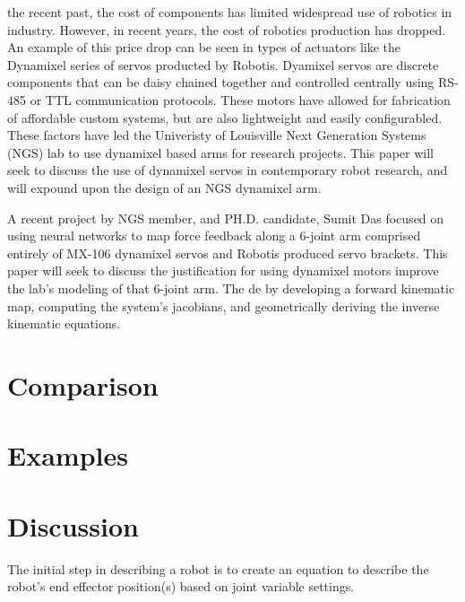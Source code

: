 \documentclass[10pt,journal]{IEEEtran}
\begin{document}
 the recent past, the cost of components has limited widespread use of robotics in industry. However, in recent years, the cost of robotics production has dropped\cite{west2015happens}. An example of this price drop can be seen in types of actuators like the Dynamixel series of servos producted by Robotis\cite{dynamixel}. Dyamixel servos are discrete components that can be daisy chained together and controlled centrally using RS-485 or TTL communication protocols\cite{dynamixelChart}. These motors have allowed for fabrication of affordable custom systems, but are also lightweight and easily configurabled. These factors have led the Univeristy of Louisville Next Generation Systems (NGS) lab to use dynamixel based arms for research projects. This paper will seek to discuss the use of dynamixel servos in contemporary robot research, and will expound upon the design of an NGS dynamixel arm.
\par A recent project by NGS member, and PH.D. candidate, Sumit Das focused on using neural networks to map force feedback along a 6-joint arm comprised entirely of MX-106 dynamixel servos and Robotis produced servo brackets. This paper will seek to discuss the justification for using dynamixel motors improve the lab's modeling of that 6-joint arm. The de by developing a forward kinematic map, computing the system's jacobians, and geometrically deriving the inverse kinematic equations. 

\section{Comparison} %

\section{Examples} %

\section{Discussion}The initial step in describing a robot is to create an equation to describe the robot's end effector position(s) based on joint variable settings.
\end{document}
